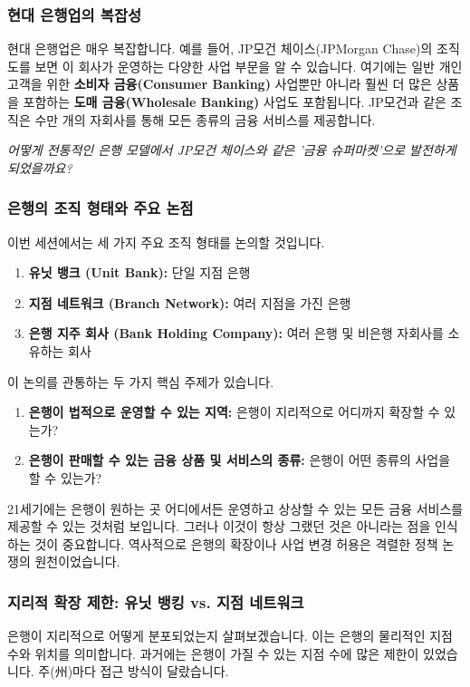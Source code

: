 \documentclass[11pt,a4paper]{article}
\theoremstyle{definition}
\begin{document}
\subsubsection*{현대 은행업의 복잡성}
현대 은행업은 매우 복잡합니다. 예를 들어, JP모건 체이스(JPMorgan Chase)의 조직도를 보면 이 회사가 운영하는 다양한 사업 부문을 알 수 있습니다. 여기에는 일반 개인 고객을 위한 \textbf{소비자 금융(Consumer Banking)} 사업뿐만 아니라 훨씬 더 많은 상품을 포함하는 \textbf{도매 금융(Wholesale Banking)} 사업도 포함됩니다. JP모건과 같은 조직은 수만 개의 자회사를 통해 모든 종류의 금융 서비스를 제공합니다.

\begin{center}
    \textit{어떻게 전통적인 은행 모델에서 JP모건 체이스와 같은 '금융 슈퍼마켓'으로 발전하게 되었을까요?}
\end{center}

\subsubsection*{은행의 조직 형태와 주요 논점}
이번 세션에서는 세 가지 주요 조직 형태를 논의할 것입니다.
\begin{enumerate}
    \item \textbf{유닛 뱅크 (Unit Bank):} 단일 지점 은행
    \item \textbf{지점 네트워크 (Branch Network):} 여러 지점을 가진 은행
    \item \textbf{은행 지주 회사 (Bank Holding Company):} 여러 은행 및 비은행 자회사를 소유하는 회사
\end{enumerate}
이 논의를 관통하는 두 가지 핵심 주제가 있습니다.
\begin{enumerate}
    \item \textbf{은행이 법적으로 운영할 수 있는 지역:} 은행이 지리적으로 어디까지 확장할 수 있는가?
    \item \textbf{은행이 판매할 수 있는 금융 상품 및 서비스의 종류:} 은행이 어떤 종류의 사업을 할 수 있는가?
\end{enumerate}
21세기에는 은행이 원하는 곳 어디에서든 운영하고 상상할 수 있는 모든 금융 서비스를 제공할 수 있는 것처럼 보입니다. 그러나 이것이 항상 그랬던 것은 아니라는 점을 인식하는 것이 중요합니다. 역사적으로 은행의 확장이나 사업 변경 허용은 격렬한 정책 논쟁의 원천이었습니다.

\subsubsection*{지리적 확장 제한: 유닛 뱅킹 vs. 지점 네트워크}
은행이 지리적으로 어떻게 분포되었는지 살펴보겠습니다. 이는 은행의 물리적인 지점 수와 위치를 의미합니다. 과거에는 은행이 가질 수 있는 지점 수에 많은 제한이 있었습니다. 주(州)마다 접근 방식이 달랐습니다.
\end{document}
